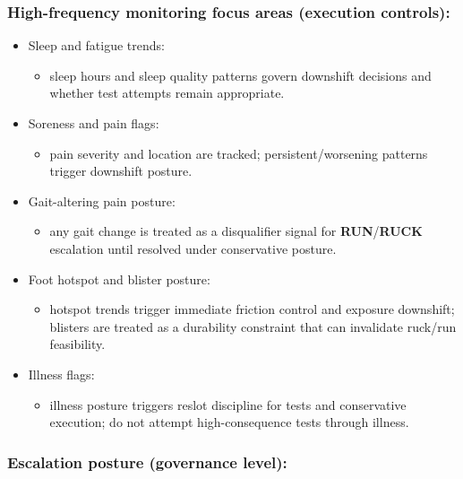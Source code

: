 \documentclass[10pt]{article}
\begin{document}
\subsubsection*{High-frequency monitoring focus areas (execution controls):}

\begin{itemize}
\item Sleep and fatigue trends:
  \begin{itemize}
  \item sleep hours and sleep quality patterns govern downshift decisions and whether test attempts remain appropriate.
  \end{itemize}
\item Soreness and pain flags:
  \begin{itemize}
  \item pain severity and location are tracked; persistent/worsening patterns trigger downshift posture.
  \end{itemize}
\item Gait-altering pain posture:
  \begin{itemize}
  \item any gait change is treated as a disqualifier signal for \textbf{RUN}/\textbf{RUCK} escalation until resolved under conservative posture.
  \end{itemize}
\item Foot hotspot and blister posture:
  \begin{itemize}
  \item hotspot trends trigger immediate friction control and exposure downshift; blisters are treated as a durability constraint that can invalidate ruck/run feasibility.
  \end{itemize}
\item Illness flags:
  \begin{itemize}
  \item illness posture triggers reslot discipline for tests and conservative execution; do not attempt high-consequence tests through illness.
  \end{itemize}
\end{itemize}

\subsubsection*{Escalation posture (governance level):}
\end{document}
